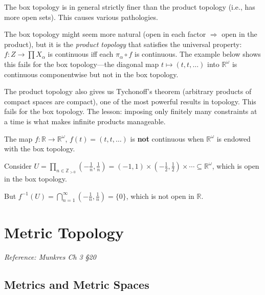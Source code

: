 \documentclass[11pt]{report}
\begin{document}
\begin{rembox}
The box topology is in general strictly finer than the product topology (i.e., has more open sets). This causes various pathologies.
\end{rembox}

\begin{rembox}
The box topology might seem more natural (open in each factor $\Rightarrow$ open in the product), but it is the \emph{product topology} that satisfies the universal property: $f: Z \to \prod X_\alpha$ is continuous iff each $\pi_\alpha \circ f$ is continuous. The example below shows this fails for the box topology---the diagonal map $t \mapsto (t, t, \ldots)$ into $\mathbb{R}^\omega$ is continuous componentwise but not in the box topology.

The product topology also gives us Tychonoff's theorem (arbitrary products of compact spaces are compact), one of the most powerful results in topology. This fails for the box topology. The lesson: imposing only finitely many constraints at a time is what makes infinite products manageable.
\end{rembox}

\begin{exbox}
The map $f: \mathbb{R} \to \mathbb{R}^\omega$, $f(t) = (t, t, \ldots)$ is \textbf{not} continuous when $\mathbb{R}^\omega$ is endowed with the box topology.

Consider $U = \prod_{n \in \mathbb{Z}_{>0}} \left(-\frac{1}{n}, \frac{1}{n}\right) = (-1, 1) \times \left(-\frac{1}{2}, \frac{1}{2}\right) \times \cdots \subseteq \mathbb{R}^\omega$, which is open in the box topology.

But $f^{-1}(U) = \bigcap_{n=1}^{\infty} \left(-\frac{1}{n}, \frac{1}{n}\right) = \{0\}$, which is not open in $\mathbb{R}$.
\end{exbox}

\section{Metric Topology}

\textit{Reference: Munkres Ch 3 \S 20}

\subsection{Metrics and Metric Spaces}
\end{document}
